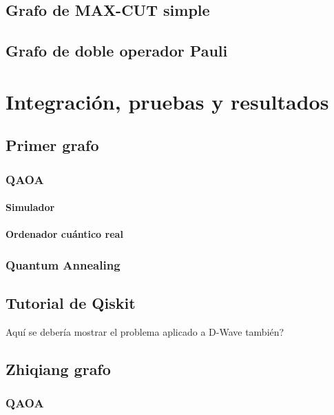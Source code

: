 \documentclass{report}
\begin{document}
\section{Grafo de MAX-CUT simple}

\section{Grafo de doble operador Pauli}  %

\chapter{Integración, pruebas y resultados}
\label{sec:integracion_pruebas_y_resultados}

\section{Primer grafo}

\subsection{QAOA}

\subsubsection{Simulador}

\subsubsection{Ordenador cuántico real}

\subsection{Quantum Annealing}

\section{Tutorial de Qiskit}
Aquí se debería mostrar el problema aplicado a D-Wave también?

\section{Zhiqiang grafo}

\subsection{QAOA}
\end{document}
